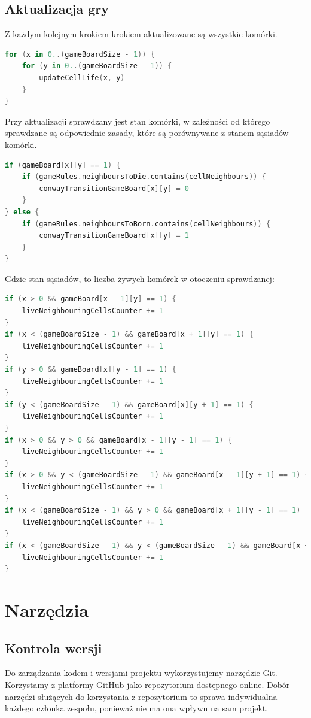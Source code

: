 \documentclass[12pt,a4paper]{article}
\begin{document}
\subsection{Aktualizacja gry}
Z każdym kolejnym krokiem krokiem aktualizowane są wszystkie komórki.
\begin{lstlisting}[language=Kotlin]
for (x in 0..(gameBoardSize - 1)) {
    for (y in 0..(gameBoardSize - 1)) {
        updateCellLife(x, y)
    }
}
\end{lstlisting}
Przy aktualizacji sprawdzany jest stan komórki, w zależności od którego sprawdzane są odpowiednie zasady, które są porównywane z stanem sąsiadów komórki.
\begin{lstlisting}[language=Kotlin]
if (gameBoard[x][y] == 1) {
    if (gameRules.neighboursToDie.contains(cellNeighbours)) {
        conwayTransitionGameBoard[x][y] = 0
    }
} else {
    if (gameRules.neighboursToBorn.contains(cellNeighbours)) {
        conwayTransitionGameBoard[x][y] = 1
    }
}
\end{lstlisting}
Gdzie stan sąsiadów, to liczba żywych komórek w otoczeniu sprawdzanej:
\begin{lstlisting}[language=Kotlin]
if (x > 0 && gameBoard[x - 1][y] == 1) {
    liveNeighbouringCellsCounter += 1
}
if (x < (gameBoardSize - 1) && gameBoard[x + 1][y] == 1) {
    liveNeighbouringCellsCounter += 1
}
if (y > 0 && gameBoard[x][y - 1] == 1) {
    liveNeighbouringCellsCounter += 1
}
if (y < (gameBoardSize - 1) && gameBoard[x][y + 1] == 1) {
    liveNeighbouringCellsCounter += 1
}
if (x > 0 && y > 0 && gameBoard[x - 1][y - 1] == 1) {
    liveNeighbouringCellsCounter += 1
}
if (x > 0 && y < (gameBoardSize - 1) && gameBoard[x - 1][y + 1] == 1) {
    liveNeighbouringCellsCounter += 1
}
if (x < (gameBoardSize - 1) && y > 0 && gameBoard[x + 1][y - 1] == 1) {
    liveNeighbouringCellsCounter += 1
}
if (x < (gameBoardSize - 1) && y < (gameBoardSize - 1) && gameBoard[x + 1][y + 1] == 1) {
    liveNeighbouringCellsCounter += 1
}
\end{lstlisting}
\section{Narzędzia}
\subsection{Kontrola wersji}
Do zarządzania kodem i wersjami projektu wykorzystujemy narzędzie Git. Korzystamy z platformy GitHub jako repozytorium dostępnego online. Dobór narzędzi służących do korzystania z repozytorium to sprawa indywidualna każdego członka zespołu, ponieważ nie ma ona wpływu na sam projekt.
\end{document}
